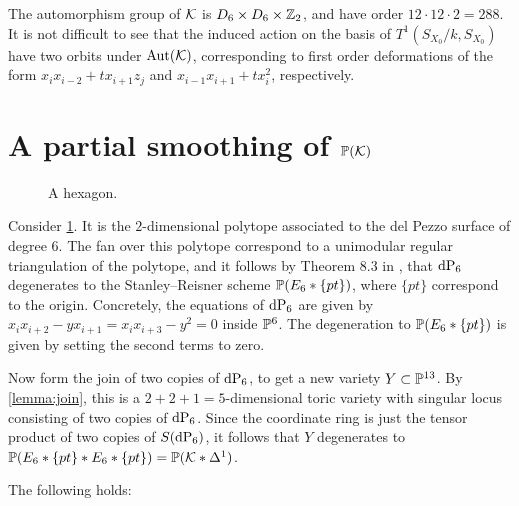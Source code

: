 The automorphism group of $\K$ is $D_6 \times D_6 \times \Z_2$, and have order $12 \cdot 12 \cdot 2=288$. It is not difficult to see that the induced action on the basis of $T^1(S_{X_0}/k,S_{X_0})$ have two orbits under $\Aut(\K)$, corresponding to first order deformations of the form $x_ix_{i-2}+t x_{i+1}z_j$ and $x_{i-1}x_{i+1}+tx_i^2$, respectively. 

\section{A partial smoothing of $\P(\mathcal K)$}

\begin{figure}[b]
\centering

\caption{A hexagon.}
\label{fig:hexagon}
\end{figure}

Consider \cref{fig:hexagon}. It is the $2$-dimensional polytope associated to the del Pezzo surface of degree $6$. The fan over this polytope correspond to a unimodular regular triangulation of the polytope, and it follows by Theorem 8.3 in \cite{sturmfels}, that $\dP6$ degenerates to the Stanley--Reisner scheme $\P(E_6 \ast \{pt\})$, where $\{ pt \}$ correspond to the origin. Concretely, the equations of $\dP6$ are given by $x_ix_{i+2}-yx_{i+1}=x_ix_{i+3}-y^2=0$ inside $\P^6$. The degeneration to $\P(E_6 \ast \{ pt \})$ is given by setting the second terms to zero.

Now form the join of two copies of $\dP6$, to get a new variety $Y \subset \P^{13}$. By \cref{lemma:join}, this is a $2+2+1=5$-dimensional toric variety with singular locus consisting of two copies of $\dP6$. Since the coordinate ring is just the tensor product of two copies of $S(\dP6)$, it follows that $Y$ degenerates to $\P(E_6 \ast \{pt\} \ast E_6 \ast \{ pt \})=\P(\K \ast \Delta^1)$.

The following holds:

